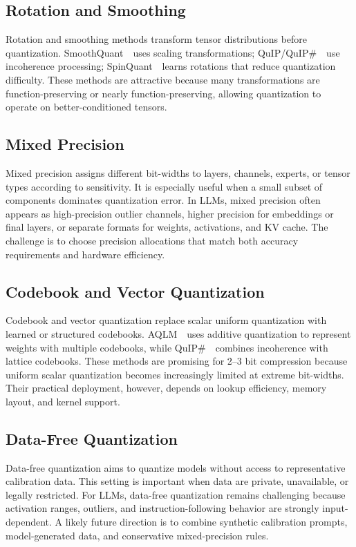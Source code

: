 \documentclass[journal,10pt]{IEEEtran}
\begin{document}
\subsection{Rotation and Smoothing}
Rotation and smoothing methods transform tensor distributions before quantization. SmoothQuant~\cite{xiao2022smoothquant}\ uses scaling transformations; QuIP/QuIP\#~\cite{chee2023quip,tsai2024quipsharp}\ use incoherence processing; SpinQuant~\cite{liu2024spinquant}\ learns rotations that reduce quantization difficulty. These methods are attractive because many transformations are function-preserving or nearly function-preserving, allowing quantization to operate on better-conditioned tensors.

\subsection{Mixed Precision}
Mixed precision assigns different bit-widths to layers, channels, experts, or tensor types according to sensitivity. It is especially useful when a small subset of components dominates quantization error. In LLMs, mixed precision often appears as high-precision outlier channels, higher precision for embeddings or final layers, or separate formats for weights, activations, and KV cache. The challenge is to choose precision allocations that match both accuracy requirements and hardware efficiency.

\subsection{Codebook and Vector Quantization}
Codebook and vector quantization replace scalar uniform quantization with learned or structured codebooks. AQLM~\cite{egiazarian2024aqlm}\ uses additive quantization to represent weights with multiple codebooks, while QuIP\#~\cite{tsai2024quipsharp}\ combines incoherence with lattice codebooks. These methods are promising for 2--3 bit compression because uniform scalar quantization becomes increasingly limited at extreme bit-widths. Their practical deployment, however, depends on lookup efficiency, memory layout, and kernel support.

\subsection{Data-Free Quantization}
Data-free quantization aims to quantize models without access to representative calibration data. This setting is important when data are private, unavailable, or legally restricted. For LLMs, data-free quantization remains challenging because activation ranges, outliers, and instruction-following behavior are strongly input-dependent. A likely future direction is to combine synthetic calibration prompts, model-generated data, and conservative mixed-precision rules.
\end{document}
